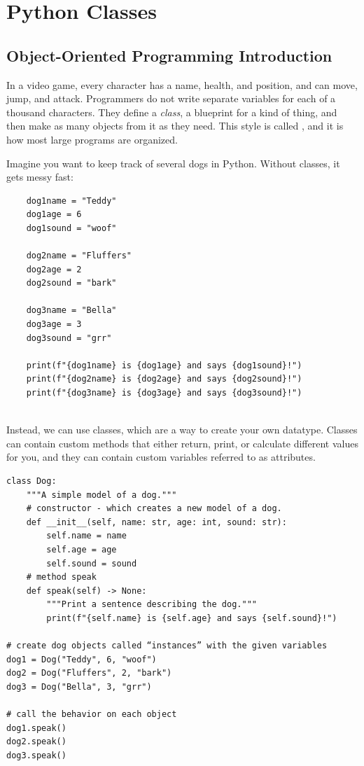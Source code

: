 \chapter{Python Classes}
\section{Object-Oriented Programming Introduction}

In a video game, every character has a name, health, and position, and can
move, jump, and attack. Programmers do not write separate variables for
each of a thousand characters. They define a \emph{class}, a blueprint for
a kind of thing, and then make as many objects from it as they need. This
style is called , and it is how most
large programs are organized.

Imagine you want to keep track of several dogs in Python. Without classes,
it gets messy fast:

\begin{verbatim}
    dog1name = "Teddy"
    dog1age = 6
    dog1sound = "woof"

    dog2name = "Fluffers"
    dog2age = 2
    dog2sound = "bark"

    dog3name = "Bella"
    dog3age = 3
    dog3sound = "grr"

    print(f"{dog1name} is {dog1age} and says {dog1sound}!")
    print(f"{dog2name} is {dog2age} and says {dog2sound}!")
    print(f"{dog3name} is {dog3age} and says {dog3sound}!")
    

\end{verbatim}

Instead, we can use classes, which are a way to create your own datatype.
Classes can contain custom methods that either return, print, or calculate different values for you, 
and they can contain custom variables referred to as attributes.

\begin{verbatim}
class Dog:
    """A simple model of a dog."""
    # constructor - which creates a new model of a dog. 
    def __init__(self, name: str, age: int, sound: str):
        self.name = name
        self.age = age
        self.sound = sound
    # method speak 
    def speak(self) -> None:
        """Print a sentence describing the dog."""
        print(f"{self.name} is {self.age} and says {self.sound}!")

# create dog objects called “instances” with the given variables
dog1 = Dog("Teddy", 6, "woof")
dog2 = Dog("Fluffers", 2, "bark")
dog3 = Dog("Bella", 3, "grr")

# call the behavior on each object
dog1.speak()
dog2.speak()
dog3.speak()

\end{verbatim}

